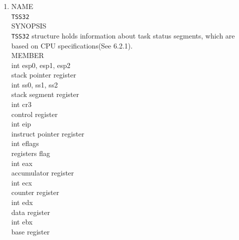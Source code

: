\documentclass{swfcthesis}
\begin{document}
\begin{enumerate}
\item
  NAME \\
  \hspace*{1cm}\texttt{TSS32} \\
  SYNOPSIS \\
  \hspace*{1cm}  \texttt{TSS32} structure holds information about task
status segments, which are based on CPU specifications(See 6.2.1\cite{intel_3a}).\\
  MEMBER \\
  \hspace*{1cm} int esp0, esp1, esp2\\
  \hspace*{1.5cm}  stack pointer register\\
  \hspace*{1cm} int ss0, ss1, ss2\\
  \hspace*{1.5cm} stack segment register\\
  \hspace*{1cm} int cr3\\
  \hspace*{1.5cm} control register\\
  \hspace*{1cm} int eip\\
  \hspace*{1.5cm} instruct pointer register\\
  \hspace*{1cm} int eflags\\
  \hspace*{1.5cm} registers flag\\
  \hspace*{1cm} int eax\\
  \hspace*{1.5cm}  accumulator register\\
  \hspace*{1cm} int ecx\\
  \hspace*{1.5cm} counter register\\
  \hspace*{1cm} int edx\\
  \hspace*{1.5cm} data register\\
  \hspace*{1cm} int ebx\\
  \hspace*{1.5cm} base register\\

\end{enumerate}
\end{document}
